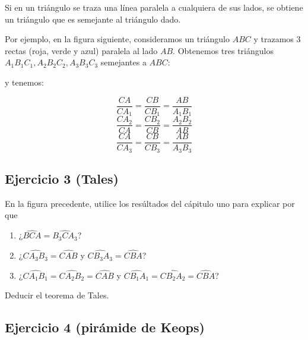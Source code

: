 Si en un triángulo se traza una línea paralela a cualquiera de sus lados, se
obtiene un triángulo que es semejante al triángulo dado.

Por ejemplo, en la figura siguiente, consideramos un triángulo $ABC$ y trazamos
3 rectas (roja, verde y azul) paralela al lado $AB$. Obtenemos tres
triángulos ${A_1B_1C_1}, {A_2B_2C_2}, {A_3B_3C_3}$ semejantes a $ABC$:

\begin{center}
\end{center}

y tenemos:

$$
\frac{CA}{CA_1} = \frac{CB}{CB_1} = \frac{AB}{A_1B_1}
$$
$$
\frac{CA_2}{CA} = \frac{CB_2}{CB} = \frac{A_2B_2}{AB}
$$
$$
\frac{CA}{CA_3} = \frac{CB}{CB_3} = \frac{AB}{A_3B_3}
$$

\subsection{Ejercicio 3 (Tales)}

En la figura precedente, utilice los resúltados del cápitulo uno para explicar
por que

\begin{enumerate}
\item ¿$\widehat{BCA} = \widehat{B_3CA_3}$?
\item ¿$\widehat{CA_3B_3} = \widehat{CAB}$ y $\widehat{CB_3A_3} = \widehat{CBA}$?
\item ¿$\widehat{CA_1B_1} = \widehat{CA_2B_2} = \widehat{CAB}$ y
  $\widehat{CB_1A_1} = \widehat{CB_2A_2} = \widehat{CBA}$?
\end{enumerate}

Deducir el teorema de Tales.

\subsection{Ejercicio 4 (pirámide de Keops)}


